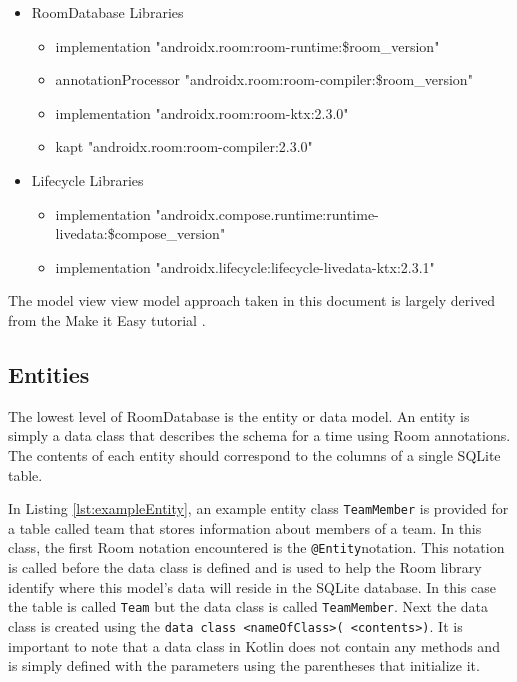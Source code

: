 \documentclass[12pt]{article}
\begin{document}
\begin{itemize}
\item RoomDatabase Libraries \begin{itemize}
    \item implementation "androidx.room:room-runtime:\$room\_version"
    \item annotationProcessor "androidx.room:room-compiler:\$room\_version"
    \item implementation "androidx.room:room-ktx:2.3.0"
    \item kapt "androidx.room:room-compiler:2.3.0"
    \end{itemize}
 \item Lifecycle Libraries \begin{itemize}
    \item implementation "androidx.compose.runtime:runtime-livedata:\$compose\_version"
    \item implementation "androidx.lifecycle:lifecycle-livedata-ktx:2.3.1"
    \end{itemize}
\end{itemize}
 \newpage
 
 The model view view model approach taken in this document is largely derived from the Make it Easy tutorial \cite{MakeItEasyRoom1} \cite{MakeItEasyRoom2} \cite{RoomCodeLab}.
 \subsection{Entities}
The lowest level of RoomDatabase is the entity or data model. An entity is simply a data class that describes the schema for a time using Room annotations. The contents of each entity should correspond to the columns of a single SQLite table. 


In Listing \ref{lst:exampleEntity}, an example entity class \verb|TeamMember| is provided for a table called team that stores information about members of a team. In this class, the first Room notation encountered is the \verb|@Entity|notation. This notation is called before the data class is defined and is used to help the Room library identify where this model's data will reside in the SQLite database. In this case the table is called \verb|Team| but the data class is called \verb|TeamMember|. 
Next the data class is created using the \verb|data class <nameOfClass>( <contents>)|. It is important to note that a data class in Kotlin does not contain any methods and is simply defined with the parameters using the parentheses that initialize it. 
\end{document}
